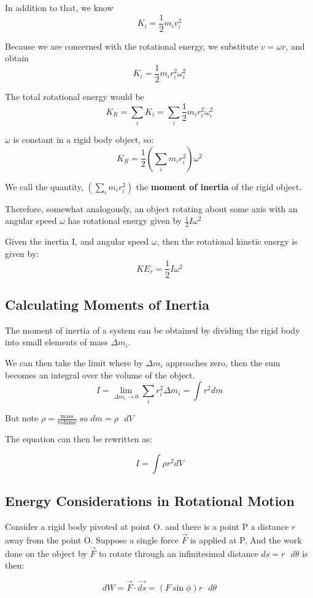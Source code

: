 In addition to that, we know $$K_i = \frac{1}{2}m_iv_i^2$$

Because we are concerned with the rotational energy, we substitute $v=\omega r$, and obtain 
$$K_i = \frac{1}{2}m_ir_i^2\omega_i^2$$

The total rotational energy would be
$$K_R = \sum_i K_i = \sum_i \frac{1}{2} m_i r_i^2 \omega_i^2$$

$\omega$ is constant in a rigid body object, so:
$$K_R = \frac{1}{2} \left(\sum_i m_i r_i^2\right) \omega ^2$$

We call the quantity, $\left(\sum_i m_i r_i^2\right)$ the \textbf{moment of inertia} of the rigid object.

Therefore, somewhat analogously, an object rotating about some axis with an angular speed $\omega$ has rotational energy given by $\frac{1}{2}I\omega^2$

\begin{form}
Given the inertia I, and angular speed $\omega$, then the rotational kinetic energy is given by:
$$KE_r=\frac{1}{2}I\omega^2$$
\end{form}
\subsection{Calculating Moments of Inertia}
The moment of inertia of a system can be obtained by dividing the rigid body into small elements of mass $\Delta m_i$.

We can then take the limit where by $\Delta m_i$ approaches zero, then the sum becomes an integral over the volume of the object.
$$I = \lim_{\Delta m_i \rightarrow 0} \sum_i r_i^2 \Delta m_i = \int r^2 dm $$

But note $\rho = \frac{\text{mass}}{\text{volume}}$ so $dm = \rho \text{ } dV$

The equation can then be rewritten as: 

$$I = \int \rho r^2 dV$$

\subsection{Energy Considerations in Rotational Motion}
Consider a rigid body pivoted at point O. and there is a point P a distance $r$ away from the point O. Suppose a single force $\vec{F}$ is applied at P, And the work done on the object by $\vec{F}$ to rotate through an infinitesimal distance $ds = r \text{ } d\theta$  is then:

$$dW = \vec{F} \cdot \vec{ds} = \left(F \sin \phi\right)r \text{ } d\theta$$

